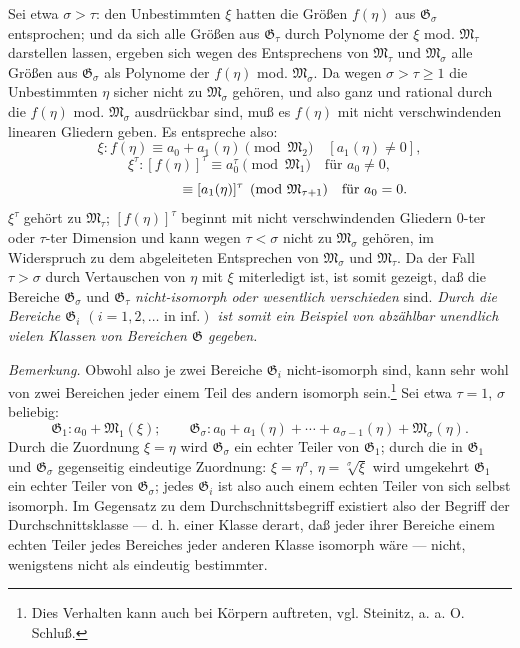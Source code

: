 \documentclass[11pt]{article}
\begin{document}
Sei etwa $\sigma>\tau$: den Unbestimmten $\xi$ hatten die Größen $f(\eta)$ aus
$\mathfrak G_\sigma$ entsprochen; und da sich alle Größen aus $\mathfrak G_\tau$
durch Polynome der $\xi$ mod. $\mathfrak M_\tau$ darstellen lassen, ergeben sich
wegen des Entsprechens von $\mathfrak M_\tau$ und $\mathfrak M_\sigma$ alle
Größen aus $\mathfrak G_\sigma$ als Polynome der $f(\eta)$ mod.
$\mathfrak M_\sigma$. Da wegen $\sigma>\tau\ge1$ die Unbestimmten $\eta$ sicher
nicht zu $\mathfrak M_\sigma$ gehören, und also ganz und rational durch die
$f(\eta)$ mod. $\mathfrak M_\sigma$ ausdrückbar sind, muß es $f(\eta)$ mit
nicht verschwindenden linearen Gliedern geben. Es entspreche also:
\[
 \xi:f(\eta)\equiv a_0+a_1(\eta)\pmod{\mathfrak M_2}\quad[a_1(\eta)\ne0],
\]
\[
 \xi^\tau:[f(\eta)]^\tau\equiv a_0^\tau\pmod{\mathfrak M_1}\quad\text{für }a_0\ne0,
\]
\[
 \hphantom{\xi^\tau:[f(\eta)]^\tau}\equiv [a_1(\eta)]^\tau
 \pmod{\mathfrak M_{\tau+1}}\quad\text{für }a_0=0.
\]
$\xi^\tau$ gehört zu $\mathfrak M_\tau$; $[f(\eta)]^\tau$ beginnt mit nicht
verschwindenden Gliedern $0$-ter oder $\tau$-ter Dimension und kann wegen
$\tau<\sigma$ nicht zu $\mathfrak M_\sigma$ gehören, im Widerspruch zu dem
abgeleiteten Entsprechen von $\mathfrak M_\sigma$ und $\mathfrak M_\tau$. Da der
Fall $\tau>\sigma$ durch Vertauschen von $\eta$ mit $\xi$ miterledigt ist, ist
somit gezeigt, daß die Bereiche $\mathfrak G_\sigma$ und $\mathfrak G_\tau$
\emph{nicht-isomorph oder wesentlich verschieden} sind. \emph{Durch die
Bereiche $\mathfrak G_i$ $(i=1,2,\ldots\text{ in inf.})$ ist somit ein Beispiel
von abzählbar unendlich vielen Klassen von Bereichen $\mathfrak G$ gegeben.}

\emph{Bemerkung.} Obwohl also je zwei Bereiche $\mathfrak G_i$ nicht-isomorph
sind, kann sehr wohl von zwei Bereichen jeder einem Teil des andern isomorph
sein.\footnote{Dies Verhalten kann auch bei Körpern auftreten, vgl. Steinitz,
a. a. O. Schluß.} Sei etwa $\tau=1$, $\sigma$ beliebig:
\[
\mathfrak G_1:a_0+\mathfrak M_1(\xi);\qquad
\mathfrak G_\sigma:a_0+a_1(\eta)+\cdots+a_{\sigma-1}(\eta)+\mathfrak M_\sigma(\eta).
\]
Durch die Zuordnung $\xi=\eta$ wird $\mathfrak G_\sigma$ ein echter Teiler von
$\mathfrak G_1$; durch die in $\mathfrak G_1$ und $\mathfrak G_\sigma$
gegenseitig eindeutige Zuordnung: $\xi=\eta^\sigma$, $\eta=\sqrt[\sigma]{\xi}$
wird umgekehrt $\mathfrak G_1$ ein echter Teiler von $\mathfrak G_\sigma$; jedes
$\mathfrak G_i$ ist also auch einem echten Teiler von sich selbst isomorph. Im
Gegensatz zu dem Durchschnittsbegriff existiert also der Begriff der
Durchschnittsklasse --- d. h. einer Klasse derart, daß jeder ihrer Bereiche einem
echten Teiler jedes Bereiches jeder anderen Klasse isomorph wäre --- nicht,
wenigstens nicht als eindeutig bestimmter.
\end{document}
